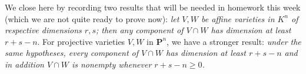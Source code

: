 \documentclass[10pt]{article}
\begin{document}
We close here by recording two results that will be needed in homework
this week (which we are not quite ready to prove now): {\sl let $V,W$ be
  affine varieties in $K^n$ of respective dimensions $r,s$; then any
  component of $V\cap W$ has dimension at least $r+s-n$}. For projective
varieties $V,W$ in $\mathbf P^n$, we have a stronger result: {\sl under the
  same hypotheses, every component of $V\cap W$ has dimension at least
  $r+s-n$ and in addition $V\cap W$ is nonempty whenever $r+s-n\ge0$.}
\end{document}
